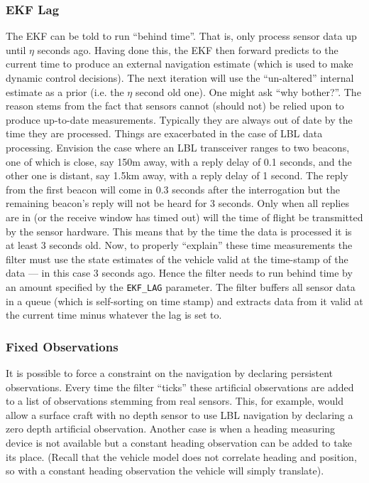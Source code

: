\documentclass[a4paper,10pt]{article}
\newcommand{\Code}[1]{\texttt{#1} }
\newcommand{\code}[1]{\Code{#1} }
\begin{document}
\subsubsection{EKF Lag}

The EKF can be told to run ``behind time''. That is, only process
sensor data up until $\eta$ seconds ago. Having done this, the EKF
then forward predicts to the current time to produce an external
navigation estimate (which is used to make dynamic control
decisions). The next iteration will use the ``un-altered''
internal estimate as a prior (i.e. the $\eta$ second old one). One
might ask ``why bother?''. The reason stems from the fact that
sensors cannot (should not) be relied upon to produce up-to-date
measurements. Typically they are always out of date by the time
they are processed. Things are exacerbated in the case of LBL data
processing. Envision the case where an LBL transceiver ranges to
two beacons, one of which is close, say 150m away, with a reply
delay of 0.1 seconds, and the other one is distant, say 1.5km away,
with a reply delay of 1 second. The reply from the first beacon
will come in 0.3 seconds after the interrogation but the remaining
beacon's reply will not be heard for 3 seconds. Only when all
replies are in (or the receive window has timed out) will the time
of flight be transmitted by the sensor hardware. This means that
by the time the data is processed it is at least 3 seconds old.
Now, to properly ``explain'' these time measurements the filter
must use the state estimates of the vehicle valid at the
time-stamp of the data --- in this case 3 seconds ago. Hence the
filter needs to run behind time by an amount specified by the
\code{EKF\_LAG} parameter. The filter buffers all sensor data in a
queue (which is self-sorting on time stamp) and extracts data from
it valid at the current time minus whatever the lag is set to.


\subsubsection{Fixed Observations}

It is possible to force a constraint on the navigation by
declaring persistent observations. Every time the filter ``ticks''
these artificial observations are added to a list of observations
stemming from real sensors. This, for example, would allow a surface
craft with no depth sensor to use LBL navigation by declaring a zero depth artificial
observation. Another case is when a heading measuring device is
not available but a constant heading observation can be added to take
its place. (Recall that the vehicle model does not correlate
heading and position, so with a constant heading observation the
vehicle will simply translate).
\end{document}
